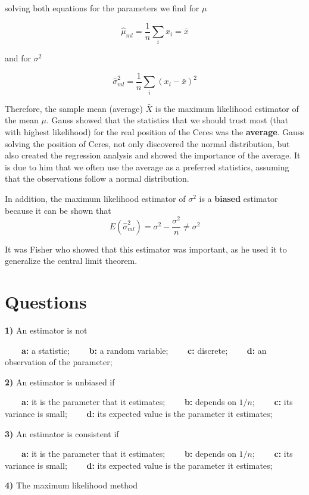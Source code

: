 \documentclass[
]{book}
\begin{document}
solving both equations for the parameters we find for \(\mu\)

\[\hat{\mu}_{ml}=\frac{1}{n}\sum_i x_i=\bar{x}\]

and for \(\sigma^2\)

\[\hat{\sigma}^2_{ml}=\frac{1}{n}\sum_i(x_i-\bar{x})^2\]

Therefore, the sample mean (average) \(\bar{X}\) is the maximum likelihood estimator of the mean \(\mu\). Gauss showed that the statistics that we should trust most (that with highest likelihood) for the real position of the Ceres was the \textbf{average}. Gauss solving the position of Ceres, not only discovered the normal distribution, but also created the regression analysis and showed the importance of the average. It is due to him that we often use the average as a preferred statistics, assuming that the observations follow a normal distribution.

In addition, the maximum likelihood estimator of \(\sigma^2\) is a \textbf{biased} estimator because it can be shown that \[E(\hat{\sigma}^2_{ml})=\sigma^2-\frac{\sigma^2}{n}\neq \sigma^2\]

It was Fisher who showed that this estimator was important, as he used it to generalize the central limit theorem.

\hypertarget{questions-9}{%
\section{Questions}\label{questions-9}}

\textbf{1)} An estimator is not

\textbf{\(\qquad\)a:} a statistic;
\textbf{\(\qquad\)b:} a random variable;
\textbf{\(\qquad\)c:} discrete;
\textbf{\(\qquad\)d:} an observation of the parameter;

\textbf{2)} An estimator is unbiased if

\textbf{\(\qquad\)a:} it is the parameter that it estimates;
\textbf{\(\qquad\)b:} depends on \(1/n\);
\textbf{\(\qquad\)c:} its variance is small;
\textbf{\(\qquad\)d:} its expected value is the parameter it estimates;

\textbf{3)} An estimator is consistent if

\textbf{\(\qquad\)a:} it is the parameter that it estimates;
\textbf{\(\qquad\)b:} depends on \(1/n\);
\textbf{\(\qquad\)c:} its variance is small;
\textbf{\(\qquad\)d:} its expected value is the parameter it estimates;

\textbf{4)} The maximum likelihood method
\end{document}
